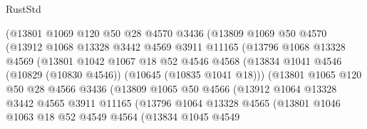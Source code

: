 \begin{lexlean}{RustStd}
\begin{coremodule}
                      (@13801
                        @1069
                        @120
                        @50
                        @28
                        @4570
                        @3436
                        (@13809
                          @1069
                          @50
                          @4570
                          (@13912
                            @1068
                            @13328
                            @3442
                            @4569
                            @3911
                            @11165
                            (@13796
                              @1068
                              @13328
                              @4569
                              (@13801
                                @1042
                                @1067
                                @18
                                @52
                                @4546
                                @4568
                                (@13834
                                  @1041
                                  @4546
                                  (@10829 (@10830 @4546))
                                  (@10645 (@10835 @1041 @18)))
                                (@13801
                                  @1065
                                  @120
                                  @50
                                  @28
                                  @4566
                                  @3436
                                  (@13809
                                    @1065
                                    @50
                                    @4566
                                    (@13912
                                      @1064
                                      @13328
                                      @3442
                                      @4565
                                      @3911
                                      @11165
                                      (@13796
                                        @1064
                                        @13328
                                        @4565
                                        (@13801
                                          @1046
                                          @1063
                                          @18
                                          @52
                                          @4549
                                          @4564
                                          (@13834
                                            @1045
                                            @4549

\end{coremodule}
\end{lexlean}
